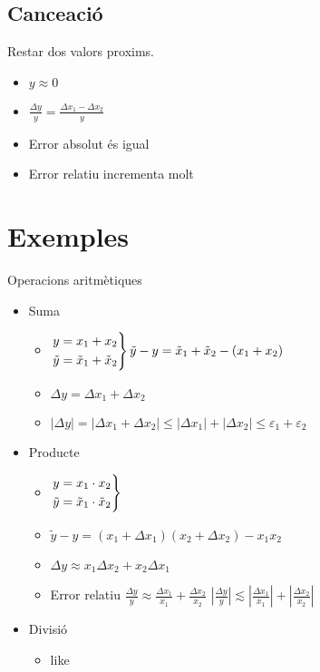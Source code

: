 \documentclass{article}
\begin{document}
\subsection{Cance\lgem ació}
Restar dos valors proxims.
\begin{itemize}
\item $y \approx 0$
\item $\frac{\Delta y}{y} = \frac{\Delta x_1 - \Delta x_2}{y}$
\item Error absolut és igual
\item Error relatiu incrementa molt
\end{itemize}

\section{Exemples}
Operacions aritmètiques
\begin{itemize}
\item Suma
	\begin{itemize}
	\item
		$
		\begin{rcases}
		y = x_1 + x_2\\
		\tilde y = \tilde x_1 + \tilde x_2
		\end{rcases}
		\tilde y - y = \tilde x_1 + \tilde x_2 - (x_1 + x_2)
		$
	\item $\Delta y = \Delta x_1 + \Delta x_2$
	\item $|\Delta y| = |\Delta x_1 + \Delta x_2| \le |\Delta x_1| + |\Delta x_2| \le \varepsilon_1 + \varepsilon_2$
	\end{itemize}

\item Producte
	\begin{itemize}
	\item
		$
		\begin{rcases}
		y = x_1 \cdot x_2\\
		\tilde y = \tilde x_1 \cdot \tilde x_2
		\end{rcases}
		$
	\item $\tilde y - y = (x_1 + \Delta x_1)(x_2 + \Delta x_2) - x_1 x_2$
	\item $\Delta y \approx x_1 \Delta x_2 + x_2 \Delta x_1$
	\item Error relatiu
		\subitem $\frac{\Delta y}{y} \approx \frac{\Delta x_1}{x_1} + \frac{\Delta x_2}{x_2}$
		\subitem $|\frac{\Delta y}{y}| \lesssim |\frac{\Delta x_1}{x_1}| + |\frac{\Delta x_2}{x_2}|$
	\end{itemize}

\item Divisió
	\begin{itemize}
	\item like
	\end{itemize}
\end{itemize}
\end{document}
